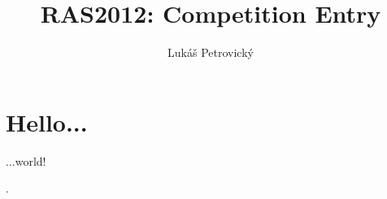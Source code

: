 \documentclass[10pt,a4paper,draft]{article}
\author{Lukáš Petrovický}
\title{RAS2012: Competition Entry}
\begin{document}
\maketitle
\listoffigures
\listoftables
\tableofcontents
 
\section{Hello...}

...world!

\appendix

.
\end{document}
